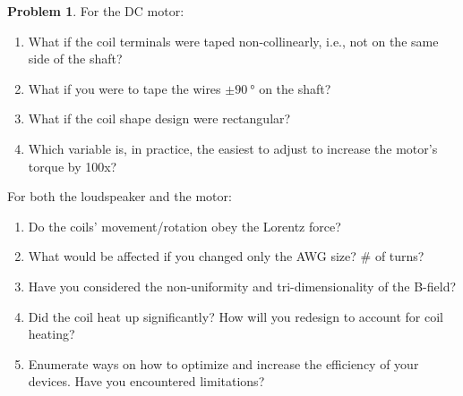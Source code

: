 \documentclass[10pt]{article}
\theoremstyle{definition}
\newtheorem{problem}{Problem}
\begin{document}
\begin{problem}
For the DC motor:
\begin{enumerate}[label=(\alph*)]
  \item What if the coil terminals were taped non-collinearly, i.e., not on the same side of the shaft?
  \item What if you were to tape the wires $\pm\qty{90}{\degree}$ on the shaft?
  \item What if the coil shape design were rectangular?
  \item Which variable is, in practice, the easiest to adjust to increase the motor's torque by 100x?
\end{enumerate}
For both the loudspeaker and the motor:
\begin{enumerate}[label=(\alph*)]
  \item Do the coils' movement/rotation obey the Lorentz force?
  \item What would be affected if you changed only the AWG size? \# of turns?
  \item Have you considered the non-uniformity and tri-dimensionality of the B-field?
  \item Did the coil heat up significantly? How will you redesign to account for coil heating?
  \item Enumerate ways on how to optimize and increase the efficiency of your devices. Have you encountered limitations?
\end{enumerate}
\end{problem}
\end{document}
